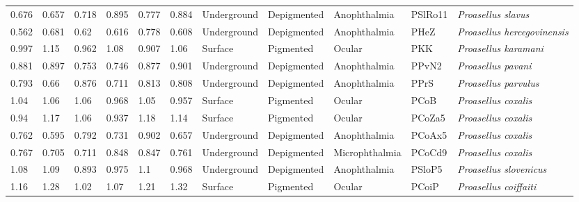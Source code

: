 \begin{tabular}{lllllllllll}
          0.676 &           0.657 &           0.718 &           0.895 &           0.777 &           0.884 &  Underground &  Depigmented &     Anophthalmia &  PSlRo11 &               \textit{Proasellus slavus} \\
          0.562 &           0.681 &            0.62 &           0.616 &           0.778 &           0.608 &  Underground &  Depigmented &     Anophthalmia &     PHeZ &      \textit{Proasellus hercegovinensis} \\
          0.997 &            1.15 &           0.962 &            1.08 &           0.907 &            1.06 &      Surface &    Pigmented &           Ocular &      PKK &             \textit{Proasellus karamani} \\
          0.881 &           0.897 &           0.753 &           0.746 &           0.877 &           0.901 &  Underground &  Depigmented &     Anophthalmia &    PPvN2 &               \textit{Proasellus pavani} \\
          0.793 &            0.66 &           0.876 &           0.711 &           0.813 &           0.808 &  Underground &  Depigmented &     Anophthalmia &     PPrS &             \textit{Proasellus parvulus} \\
           1.04 &            1.06 &            1.06 &           0.968 &            1.05 &           0.957 &      Surface &    Pigmented &           Ocular &     PCoB &              \textit{Proasellus coxalis} \\
           0.94 &            1.17 &            1.06 &           0.937 &            1.18 &            1.14 &      Surface &    Pigmented &           Ocular &   PCoZa5 &              \textit{Proasellus coxalis} \\
          0.762 &           0.595 &           0.792 &           0.731 &           0.902 &           0.657 &  Underground &  Depigmented &     Anophthalmia &   PCoAx5 &              \textit{Proasellus coxalis} \\
          0.767 &           0.705 &           0.711 &           0.848 &           0.847 &           0.761 &  Underground &  Depigmented &   Microphthalmia &   PCoCd9 &              \textit{Proasellus coxalis} \\
           1.08 &            1.09 &           0.893 &           0.975 &             1.1 &           0.968 &  Underground &  Depigmented &     Anophthalmia &   PSloP5 &           \textit{Proasellus slovenicus} \\
           1.16 &            1.28 &            1.02 &            1.07 &            1.21 &            1.32 &      Surface &    Pigmented &           Ocular &    PCoiP &            \textit{Proasellus coiffaiti} \\

\end{tabular}
